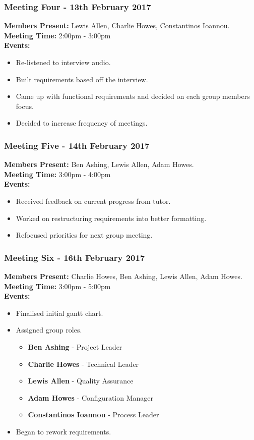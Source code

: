 \documentclass[a4paper]{article}
\begin{document}
\subsubsection*{Meeting Four - 13th February 2017}
\textbf{Members Present:} Lewis Allen, Charlie Howes, Constantinos Ioannou. \\
\textbf{Meeting Time:} 2:00pm - 3:00pm \\
\textbf{Events:} 
\begin{itemize}
    \item Re-listened to interview audio.
    \item Built requirements based off the interview.
    \item Came up with functional requirements and decided on each group members focus.
    \item Decided to increase frequency of meetings.
\end{itemize}

\subsubsection*{Meeting Five - 14th February 2017}
\textbf{Members Present:} Ben Ashing, Lewis Allen, Adam Howes. \\
\textbf{Meeting Time:} 3:00pm - 4:00pm \\
\textbf{Events:} 
\begin{itemize}
    \item Received feedback on current progress from tutor.
    \item Worked on restructuring requirements into better formatting.
    \item Refocused priorities for next group meeting.
\end{itemize}

\subsubsection*{Meeting Six - 16th February 2017}
\textbf{Members Present:} Charlie Howes, Ben Ashing, Lewis Allen, Adam Howes. \\
\textbf{Meeting Time:} 3:00pm - 5:00pm \\
\textbf{Events:} 
\begin{itemize}
    \item Finalised initial gantt chart.
    \item Assigned group roles.
    \begin{itemize}
        \item \textbf{Ben Ashing} - Project Leader
        \item \textbf{Charlie Howes} - Technical Leader
        \item \textbf{Lewis Allen} - Quality Assurance
        \item \textbf{Adam Howes} - Configuration Manager
        \item \textbf{Constantinos Ioannou} - Process Leader
    \end{itemize}
    \item Began to rework requirements.
\end{itemize}
\end{document}

